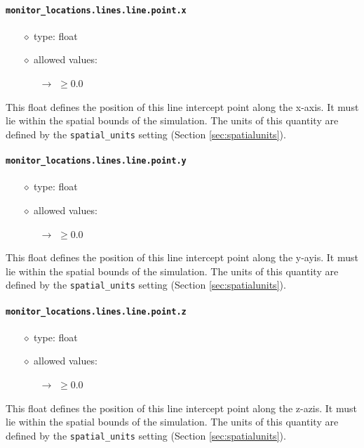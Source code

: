 \documentclass[]{article}
\def\code#1{\texttt{#1}}
\begin{document}
\paragraph{\code{monitor\_locations.lines.line.point.x}}
\begin{itemize}
    \item[$\diamond$] type: float 
    \item[$\diamond$] allowed values:
    \begin{itemize}
        \item[$\rightarrow$] $\geq0.0$
    \end{itemize}
\end{itemize}
This float defines the position of this line intercept point along the x-axis. It
must lie within the spatial bounds of the simulation. The units of this quantity
are defined by the \code{spatial\_units} setting (Section
\ref{sec:spatialunits}).

\paragraph{\code{monitor\_locations.lines.line.point.y}}
\begin{itemize}
    \item[$\diamond$] type: float 
    \item[$\diamond$] allowed values:
    \begin{itemize}
        \item[$\rightarrow$] $\geq0.0$
    \end{itemize}
\end{itemize}
This float defines the position of this line intercept point along the y-ayis. It
must lie within the spatial bounds of the simulation. The units of this quantity
are defined by the \code{spatial\_units} setting (Section
\ref{sec:spatialunits}).

\paragraph{\code{monitor\_locations.lines.line.point.z}}
\begin{itemize}
    \item[$\diamond$] type: float 
    \item[$\diamond$] allowed values:
    \begin{itemize}
        \item[$\rightarrow$] $\geq0.0$
    \end{itemize}
\end{itemize}
This float defines the position of this line intercept point along the z-azis. It
must lie within the spatial bounds of the simulation. The units of this quantity
are defined by the \code{spatial\_units} setting (Section
\ref{sec:spatialunits}).
\end{document}

